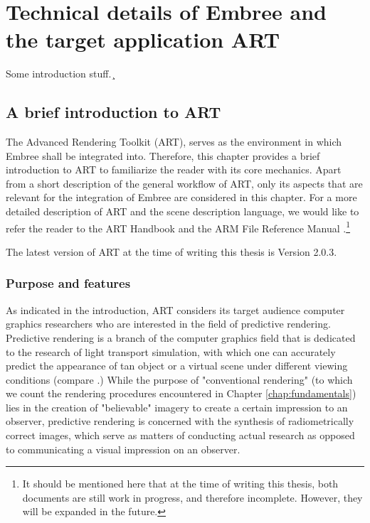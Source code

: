 \chapter{Technical details of Embree and the target application ART}
\label{chap:technical_overview}

Some introduction stuff.¸ 

\section{A brief introduction to ART}
\label{chap:art}

The Advanced Rendering Toolkit (ART), serves as the environment in which Embree shall be integrated into. Therefore, this chapter provides a brief introduction to ART to familiarize the reader with its core mechanics. Apart from a short description of the general workflow of ART, only its aspects that are relevant for the integration of Embree are considered in this chapter. For a more detailed description of ART and the scene description language, we would like to refer the reader to the ART Handbook \cite{arthandbook} and the ARM File Reference Manual \cite{artreferencemanual}.\footnote{It should be mentioned here that at the time of writing this thesis, both documents are still work in progress, and therefore incomplete. However, they will be expanded in the future.}

The latest version of ART at the time of writing this thesis is Version 2.0.3.


\subsection{Purpose and features}

As indicated in the introduction, ART considers its target audience computer graphics researchers who are interested in the field of predictive rendering. Predictive rendering is a branch of the computer graphics field that is dedicated to the research of light transport simulation, with which one can accurately predict the appearance of tan object or a virtual scene under different viewing conditions (compare \cite{wilkie2009predictive}.)  While the purpose of "conventional rendering" (to which we count the rendering procedures encountered in Chapter \ref{chap:fundamentals}) lies in the creation of "believable" imagery to create a certain impression to an observer, predictive rendering is concerned with the synthesis of radiometrically correct images, which serve as matters of conducting actual research as opposed to communicating a visual impression on an observer.


